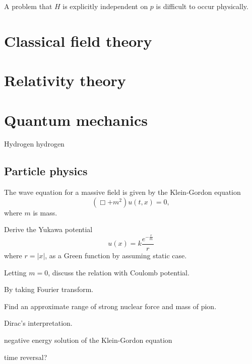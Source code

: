 \documentclass{../prb}
\begin{document}
A problem that $H$ is explicitly independent on $p$ is difficult to occur physically.

\chapter{Classical field theory}



\chapter{Relativity theory}



\chapter{Quantum mechanics}
\begin{prb}
Hydrogen
\q hydrogen
\end{prb}


\section{Particle physics}
\begin{prb}
The wave equation for a massive field is given by the Klein-Gordon equation
\[(\Box+m^2)u(t,x)=0,\]
where $m$ is mass.
\begin{cond}
\item Derive the Yukawa potential\[u(x)=k\frac{e^{-\frac rm}}r\]where $r=|x|$, as a Green function by assuming static case.
\item Letting $m=0$, discuss the relation with Coulomb potential.
\item By taking Fourier transform.
\item Find an approximate range of strong nuclear force and mass of pion.
\end{cond}
\end{prb}

\begin{prb}
Dirac's interpretation.
\item negative energy solution of the Klein-Gordon equation
\item time reversal?
\end{prb}

\begin{prb}
\end{prb}

\begin{prb}
\end{prb}
\end{document}
